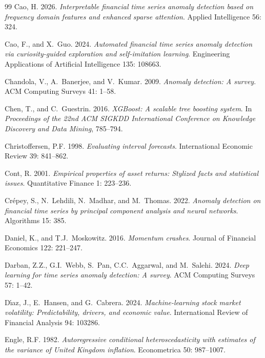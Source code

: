 \documentclass[]{interact}
\begin{document}
\begin{thebibliography}{99}
Cao, H. 2026. \emph{Interpretable financial time series anomaly detection based on frequency domain features and enhanced sparse attention}. Applied Intelligence 56: 324. 

Cao, F., and X.~Guo. 2024. \emph{Automated financial time series anomaly detection via curiosity-guided exploration and self-imitation learning}. Engineering Applications of Artificial Intelligence 135: 108663.

Chandola, V., A.~Banerjee, and V.~Kumar. 2009. \emph{Anomaly detection: A survey}. ACM Computing Surveys 41: 1--58.

Chen, T., and C.~Guestrin. 2016. \emph{XGBoost: A scalable tree boosting system}. In \emph{Proceedings of the 22nd ACM SIGKDD International Conference on Knowledge Discovery and Data Mining}, 785--794.

Christoffersen, P.F. 1998. \emph{Evaluating interval forecasts}. International Economic Review 39: 841--862.

Cont, R. 2001. \emph{Empirical properties of asset returns: Stylized facts and statistical issues}. Quantitative Finance 1: 223--236.

Cr\'{e}pey, S., N.~Lehdili, N.~Madhar, and M.~Thomas. 2022. \emph{Anomaly detection on financial time series by principal component analysis and neural networks}. Algorithms 15: 385.

Daniel, K., and T.J.~Moskowitz. 2016. \emph{Momentum crashes}. Journal of Financial Economics 122: 221--247.

Darban, Z.Z., G.I.~Webb, S.~Pan, C.C.~Aggarwal, and M.~Salehi. 2024. \emph{Deep learning for time series anomaly detection: A survey}. ACM Computing Surveys 57: 1--42.

D\'{\i}az, J., E.~Hansen, and G.~Cabrera. 2024. \emph{Machine-learning stock market volatility: Predictability, drivers, and economic value}. International Review of Financial Analysis 94: 103286. 

Engle, R.F. 1982. \emph{Autoregressive conditional heteroscedasticity with estimates of the variance of United Kingdom inflation}. Econometrica 50: 987--1007.


\end{thebibliography}
\end{document}
